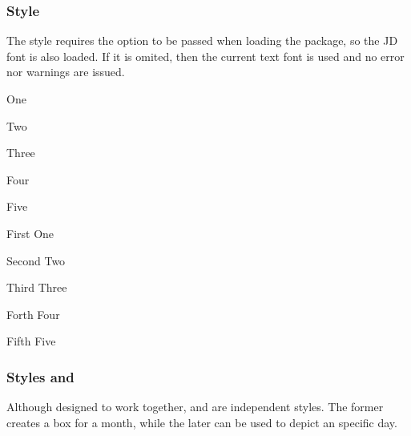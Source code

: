 \documentclass[a4paper, 11pt]{article}
\begin{document}
\subsubsection*{Style }

The style  requires the option  to be passed when loading the package, so the JD font is also loaded. If it is omited, then the current text font is used and no error nor warnings are issued.

\begin{example}{}
    \begin{PLTBoxRaster}[handwriting, palette = toasted-peach, width = 0.4\linewidth]
        \item One
        \item Two
        \item Three
        \item Four
        \item Five
    \end{PLTBoxRaster}\hfill%
    \begin{PLTBoxRaster}[handwriting, palette = toasted-peach, width = 0.4\linewidth]
        \item [First] One
        \item [Second] Two
        \item [Third] Three
        \item [Forth] Four
        \item [Fifth] Five
    \end{PLTBoxRaster}
\end{example}


\subsubsection*{Styles  and }

Although designed to work together,  and  are independent styles. The former creates a box for a month, while the later can be used to depict an specific day.
\end{document}
